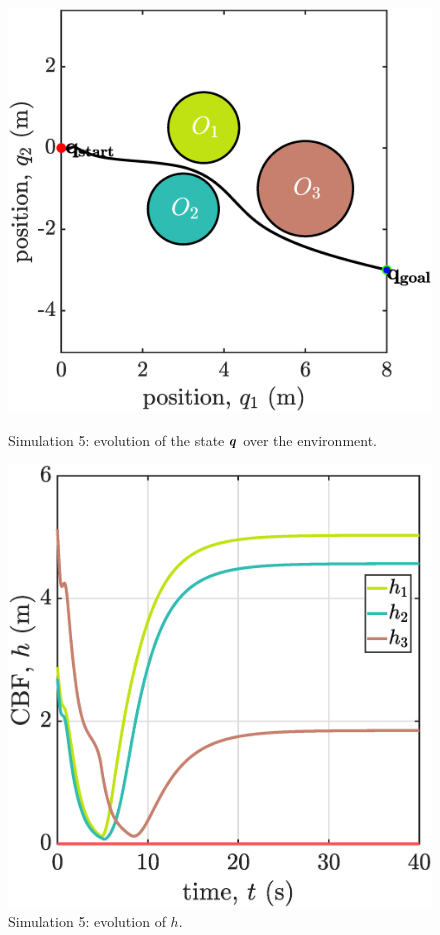 \begin{figure}[!ht]
    \begin{minipage}[b]{0.46\linewidth}
    \includegraphics[width=\textwidth]{figures/sim5map.eps}
    \caption{\label{fig:sim5map}Simulation 5: evolution of the state ${\boldsymbol{q}}$ over the environment.}
    \end{minipage}
    \hfill
    \begin{minipage}[b]{0.46\linewidth}
    \includegraphics[width=\textwidth]{figures/sim5h.eps}
    \caption{\label{fig:sim5h}Simulation 5: evolution of $h$.\\~}
    \end{minipage}
    

\end{figure}
